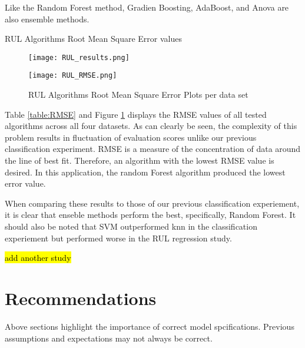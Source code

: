 Like the Random Forest method, Gradien Boosting, AdaBoost, and Anova are also ensemble methods.


\begin{table}[h]
    \bigskip
    \caption{RUL Algorithms Root Mean Square Error values\cite{RUL}}
    \begin{figure}[H]
        \texttt{[image: RUL\_results.png]}
        \centering
    \end{figure}
    \label{table:RMSE}
\end{table}

\begin{figure}[H]
    \caption{RUL Algorithms Root Mean Square Error Plots per data set\cite{RUL}}
    \texttt{[image: RUL\_RMSE.png]}
    \label{fig:RMSE Plots}
\end{figure}

Table \ref{table:RMSE} and Figure \ref{fig:RMSE Plots} displays the RMSE values of all tested algorithms across all four datasets.
As can clearly be seen, the complexity of this problem results in fluctuation of evaluation scores unlike our previous classification experiment.
RMSE is a measure of the concentration of data around the line of best fit. Therefore, an algorithm with the lowest RMSE value is desired.
In this application, the random Forest algorithm produced the lowest error value.

When comparing these results to those of our previous classification experiement, it is clear that enseble methods perform the best, specifically, Random Forest. 
It should also be noted that SVM outperformed knn in the classification experiement but performed worse in the RUL regression study.


\bigskip
\hl{add another study}

\section{Recommendations}
Above sections highlight the importance of correct model spcifications. Previous assumptions and expectations may not always be correct.

